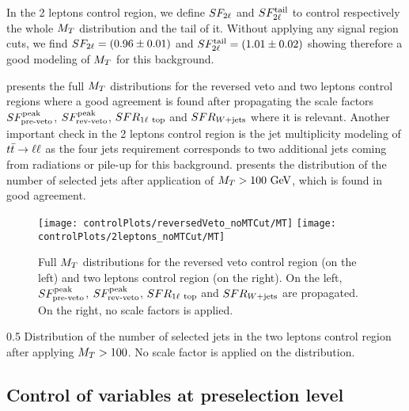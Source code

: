         In the 2 leptons control region, we define $SF_{2\ell}$ and $SF_{2\ell}^{\text{tail}}$ to
        control respectively the whole $M_T$ distribution and the tail of it.
        Without applying any signal region cuts, we find $SF_{2\ell} = (0.96 \pm 0.01)$
        and $SF_{2\ell}^{\text{tail}} = (1.01 \pm 0.02)$ showing therefore a good modeling of $M_T$
        for this background.

         presents the full $M_T$ distributions
        for the reversed veto and two leptons control regions where a good agreement is
        found after propagating the scale factors $SF_{\text{pre-veto}}^{\text{peak}}$, $SF_{\text{rev-veto}}^{\text{peak}}$, $SFR_{1\ell~\text{top}}$
        and $SFR_{\text{$W$+jets}}$ where it is relevant.
        Another important check in the 2 leptons control region is the jet multiplicity
        modeling of $t\bar{t} \rightarrow \ell \ell$ as the four jets requirement corresponds to two
        additional jets coming from radiations or pile-up for this background.
         presents the distribution of the number
        of selected jets after application of $M_T>100~\text{GeV}$, which is found in good agreement.


        \begin{figure}[h!]
            \centering
            \texttt{[image: controlPlots/reversedVeto\_noMTCut/MT]}
            \texttt{[image: controlPlots/2leptons\_noMTCut/MT]}
            \caption{Full $M_T$ distributions for the reversed veto control region (on the left) and two leptons control region (on the right). On the left, $SF_{\text{pre-veto}}^{\text{peak}}$, $SF_{\text{rev-veto}}^{\text{peak}}$, $SFR_{1\ell~\text{top}}$ and $SFR_{\text{$W$+jets}}$ are propagated. On the right, no scale factors is applied.}
                    \label{fig:preselMT2leptonAndLepPlusVeto}
        \end{figure}

                     {0.5}
                     {Distribution of the number of selected jets in the two leptons control
                     region after applying $M_T > 100$. No scale factor is applied on the
                     distribution.}

        \subsection{Control of variables at preselection level}

